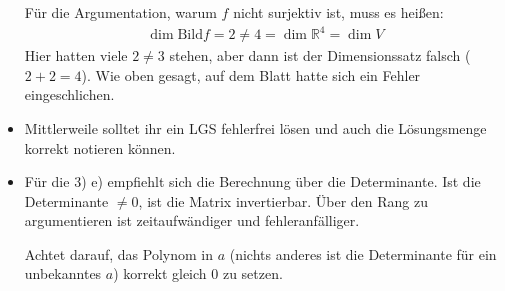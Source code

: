 \documentclass[11pt, a4paper]{article}
\newcommand{\R}{\mathbb{R}}
\begin{document}
\begin{itemize}
Für die Argumentation, warum $f$ nicht surjektiv ist, muss es heißen:
\begin{align*}
\dim \text{Bild} f = 2 \neq 4 = \dim \R^4 = \dim V
\end{align*}
Hier hatten viele $2 \neq 3$ stehen, aber dann ist der Dimensionssatz falsch ($2 + 2 = 4$). Wie oben gesagt, auf dem Blatt hatte sich ein Fehler eingeschlichen.
 
\item Mittlerweile solltet ihr ein LGS fehlerfrei lösen und auch die Lösungsmenge korrekt notieren können.

\item Für die 3) e) empfiehlt sich die Berechnung über die Determinante. Ist die Determinante $\neq 0$, ist die Matrix invertierbar. Über den Rang zu argumentieren ist zeitaufwändiger und fehleranfälliger.

Achtet darauf, das Polynom in $a$ (nichts anderes ist die Determinante für ein unbekanntes $a$) korrekt gleich $0$ zu setzen.
\end{itemize}










\newpage
\end{document}

